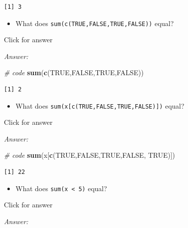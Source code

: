 \documentclass[
]{book}
\newenvironment{Shaded}{\begin{snugshade}}{\end{snugshade}}
\newcommand{\CommentTok}[1]{\textcolor[rgb]{0.56,0.35,0.01}{\textit{#1}}}
\newcommand{\ConstantTok}[1]{\textcolor[rgb]{0.56,0.35,0.01}{#1}}
\newcommand{\FunctionTok}[1]{\textcolor[rgb]{0.13,0.29,0.53}{\textbf{#1}}}
\newcommand{\NormalTok}[1]{#1}
\providecommand{\tightlist}{%
  \setlength{\itemsep}{0pt}\setlength{\parskip}{0pt}}
\begin{document}
\begin{verbatim}
[1] 3
\end{verbatim}

\begin{itemize}
\tightlist
\item
  What does \texttt{sum(c(TRUE,FALSE,TRUE,FALSE))} equal?
\end{itemize}

Click for answer

\emph{Answer:}

\begin{Shaded}
\begin{Highlighting}[]
\CommentTok{\# code}
\FunctionTok{sum}\NormalTok{(}\FunctionTok{c}\NormalTok{(}\ConstantTok{TRUE}\NormalTok{,}\ConstantTok{FALSE}\NormalTok{,}\ConstantTok{TRUE}\NormalTok{,}\ConstantTok{FALSE}\NormalTok{))}
\end{Highlighting}
\end{Shaded}

\begin{verbatim}
[1] 2
\end{verbatim}

\begin{itemize}
\tightlist
\item
  What does \texttt{sum(x{[}c(TRUE,FALSE,TRUE,FALSE){]})} equal?
\end{itemize}

Click for answer

\emph{Answer:}

\begin{Shaded}
\begin{Highlighting}[]
\CommentTok{\# code}
\FunctionTok{sum}\NormalTok{(x[}\FunctionTok{c}\NormalTok{(}\ConstantTok{TRUE}\NormalTok{,}\ConstantTok{FALSE}\NormalTok{,}\ConstantTok{TRUE}\NormalTok{,}\ConstantTok{FALSE}\NormalTok{, }\ConstantTok{TRUE}\NormalTok{)])}
\end{Highlighting}
\end{Shaded}

\begin{verbatim}
[1] 22
\end{verbatim}

\begin{itemize}
\tightlist
\item
  What does \texttt{sum(x\ \textless{}\ 5)} equal?
\end{itemize}

Click for answer

\emph{Answer:}
\end{document}
